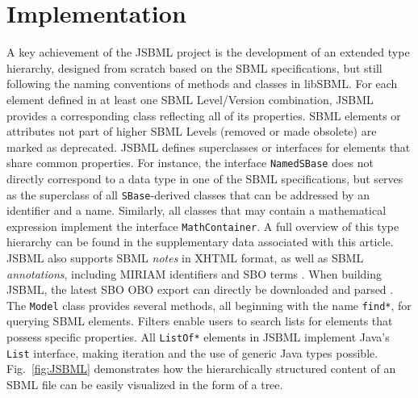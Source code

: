 \documentclass{bioinfo}
\begin{document}
\section{Implementation}

A key achievement of the JSBML project is the development of an extended type
hierarchy, designed from scratch based on the SBML specifications, but still
following the naming conventions of methods and classes in
libSBML. For each element defined in at least one SBML Level/Version combination,
JSBML provides a corresponding class reflecting all of its properties. SBML
elements or attributes not part of higher SBML Levels (removed or made
obsolete) are marked as deprecated. JSBML defines superclasses or interfaces for
elements that share common properties. For instance, the interface
\texttt{NamedSBase} does not directly correspond to a data type in one of the
SBML specifications, but serves as the superclass of all \texttt{SBase}-derived
classes that can be addressed by an identifier and a name. Similarly, all classes
that may contain a mathematical expression implement the
interface \texttt{MathContainer}. A full overview of this type hierarchy can be
found in the supplementary data associated with this article. JSBML also
supports SBML \emph{notes} in XHTML format, as well as SBML
\emph{annotations}, including MIRIAM identifiers \citep{Novere2005} and
SBO terms \citep{Novere2006b}.
When building JSBML, the latest SBO OBO export can directly be downloaded and
parsed \citep{Holland2008}.
The \texttt{Model} class provides several methods, all beginning with the name
\texttt{find*}, for querying SBML elements. Filters enable users to search lists
for elements that possess specific properties. All \texttt{ListOf*} elements in
JSBML implement Java's \texttt{List} interface, making iteration and the use of
generic Java types possible. Fig.~\ref{fig:JSBML} demonstrates how the
hierarchically structured content of an SBML file can be easily visualized in the form
of a tree.
\end{document}
